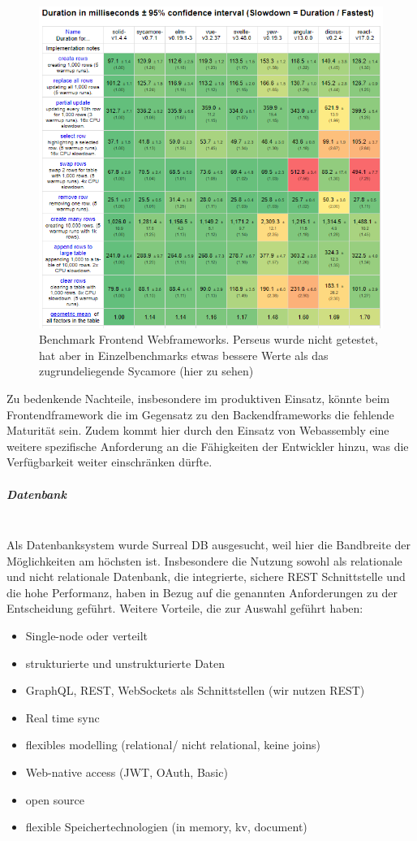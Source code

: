 \documentclass[notitlepage, hidelinks]{article}
\begin{document}
\begin{figure}[H]
\centering
  \includegraphics[width=\textwidth]{images/bm.png}
  \caption{Benchmark Frontend Webframeworks. Perseus wurde nicht getestet, hat aber in Einzelbenchmarks etwas bessere Werte als das zugrundeliegende Sycamore (hier zu sehen)}
  \label{fig:clientbenchmark}
\end{figure}


Zu bedenkende Nachteile, insbesondere im produktiven Einsatz, könnte beim Frontendframework die im Gegensatz zu den Backendframeworks die fehlende Maturität sein. Zudem kommt hier durch den Einsatz von Webassembly eine weitere spezifische Anforderung an die Fähigkeiten der Entwickler hinzu, was die Verfügbarkeit weiter einschränken dürfte.

\subparagraph{Datenbank} \mbox{} \\
Als Datenbanksystem wurde Surreal DB ausgesucht, weil hier die Bandbreite der Möglichkeiten am höchsten ist. Insbesondere die Nutzung sowohl als relationale und nicht relationale Datenbank, die integrierte, sichere REST Schnittstelle und die hohe Performanz, haben in Bezug auf die genannten Anforderungen zu der Entscheidung geführt. Weitere Vorteile, die zur Auswahl geführt haben:
\begin{itemize}
\item Single-node oder verteilt
\item strukturierte und unstrukturierte Daten
\item GraphQL, REST, WebSockets als Schnittstellen (wir nutzen REST)
\item Real time sync
\item flexibles modelling (relational/ nicht relational, keine joins)
\item Web-native access (JWT, OAuth, Basic)
\item open source
\item flexible Speichertechnologien (in memory, kv, document)
\end{itemize}
\end{document}
